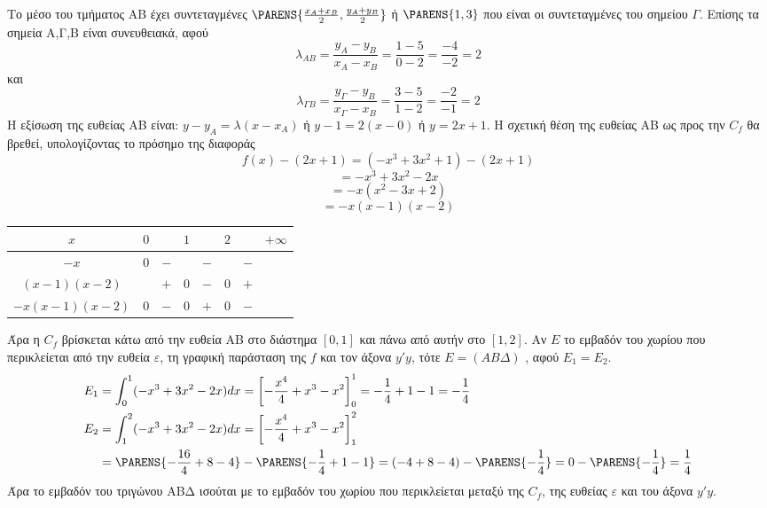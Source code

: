 \begin{alist}
\item [β)] Το μέσο του τμήματος AB έχει συντεταγμένες $\PARENS{\frac{x_A+x_B}{2}, \frac{y_A+y_B}{2}}$ ή $\PARENS{1,3}$ που είναι οι συντεταγμένες του σημείου $\Gamma$. Επίσης τα σημεία A,Γ,B είναι συνευθειακά, αφού
\[ \lambda_{AB} = \frac{y_A-y_B}{x_A-x_B} = \frac{1-5}{0-2} = \frac{-4}{-2} = 2 \]
και
\[ \lambda_{\Gamma B} = \frac{y_\Gamma-y_B}{x_\Gamma-x_B} = \frac{3-5}{1-2} = \frac{-2}{-1} = 2 \]
Η εξίσωση της ευθείας ΑΒ είναι: $y-y_A = \lambda(x-x_A)$ ή $y-1 = 2(x-0)$ ή $y=2x+1$.
Η σχετική θέση της ευθείας ΑΒ ως προς την $C_f$ θα βρεθεί, υπολογίζοντας το πρόσημο της διαφοράς
\[ f(x) - (2x+1) = (-x^3 + 3x^2 + 1) - (2x+1) \]
\[ = -x^3 + 3x^2 - 2x \]
\[ = -x(x^2 - 3x + 2) \]
\[ = -x(x-1)(x-2) \]
\begin{center}
\begin{tabular}{|c||c|c|c|c|c|c|c|}
\hline
$x$ & $0$ & & $1$ & & $2$ & & $+\infty$ \\
\hline \hline
$-x$ & $0$ & $-$ & & $-$ & & $-$ & \\
\hline
$(x-1)(x-2)$ & & $+$ & $0$ & $-$ & $0$ & $+$ & \\
\hline
$-x(x-1)(x-2)$ & $0$ & $-$ & $0$ & $+$ & $0$ & $-$ & \\
\hline
\end{tabular}
\end{center}
Άρα η $C_f$ βρίσκεται κάτω από την ευθεία ΑΒ στο διάστημα $[0,1]$ και πάνω από αυτήν στο $[1,2]$.
Αν $E$ το εμβαδόν του χωρίου που περικλείεται από την ευθεία $\varepsilon$, τη γραφική παράσταση της $f$ και τον άξονα $y'y$, τότε $E = (AB\Delta)$ , αφού $E_1 = E_2$.
\begin{align*}
E_1 &= \int_0^1 (-x^3+3x^2-2x)dx = \left[ -\frac{x^4}{4} + x^3 - x^2 \right]_0^1 = -\frac{1}{4} + 1 - 1 = -\frac{1}{4} \\
E_2 &= \int_1^2 (-x^3+3x^2-2x)dx = \left[ -\frac{x^4}{4} + x^3 - x^2 \right]_1^2 \\
    &= \PARENS{-\frac{16}{4} + 8 - 4} - \PARENS{-\frac{1}{4} + 1 - 1} = (-4+8-4) - \PARENS{-\frac{1}{4}} = 0 - \PARENS{-\frac{1}{4}} = \frac{1}{4}
\end{align*}
Άρα το εμβαδόν του τριγώνου ΑΒΔ ισούται με το εμβαδόν του χωρίου που περικλείεται μεταξύ της $C_f$, της ευθείας $\varepsilon$ και του άξονα $y'y$.
\monades{}


\end{alist}

